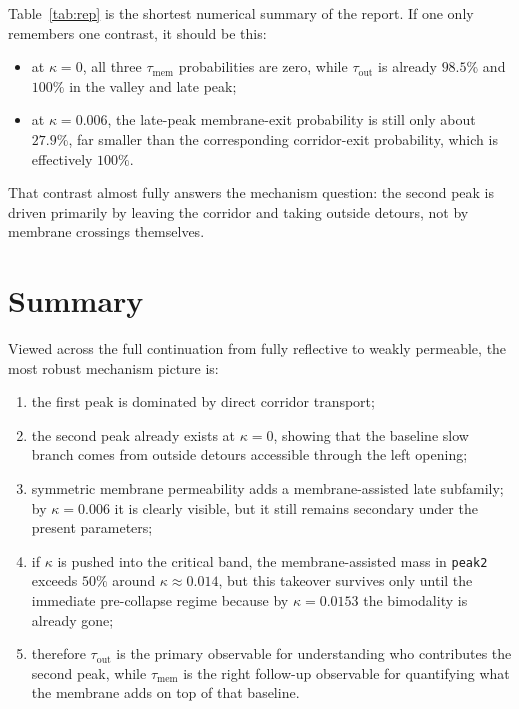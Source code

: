 \documentclass[11pt]{article}
\begin{document}
Table~\ref{tab:rep} is the shortest numerical summary of the report. If one only remembers one contrast, it should be this:
\begin{itemize}
  \item at \(\kappa=0\), all three \(\tau_{\mathrm{mem}}\) probabilities are zero, while \(\tau_{\mathrm{out}}\) is already \(98.5\%\) and \(100\%\) in the valley and late peak;
  \item at \(\kappa=0.006\), the late-peak membrane-exit probability is still only about \(27.9\%\), far smaller than the corresponding corridor-exit probability, which is effectively \(100\%\).
\end{itemize}
That contrast almost fully answers the mechanism question: the second peak is driven primarily by leaving the corridor and taking outside detours, not by membrane crossings themselves.

\section*{Summary}
Viewed across the full continuation from fully reflective to weakly permeable, the most robust mechanism picture is:
\begin{enumerate}
  \item the first peak is dominated by direct corridor transport;
  \item the second peak already exists at \(\kappa=0\), showing that the baseline slow branch comes from outside detours accessible through the left opening;
  \item symmetric membrane permeability adds a membrane-assisted late subfamily; by \(\kappa=0.006\) it is clearly visible, but it still remains secondary under the present parameters;
  \item if \(\kappa\) is pushed into the critical band, the membrane-assisted mass in \texttt{peak2} exceeds \(50\%\) around \(\kappa\approx 0.014\), but this takeover survives only until the immediate pre-collapse regime because by \(\kappa=0.0153\) the bimodality is already gone;
  \item therefore \(\tau_{\mathrm{out}}\) is the primary observable for understanding who contributes the second peak, while \(\tau_{\mathrm{mem}}\) is the right follow-up observable for quantifying what the membrane adds on top of that baseline.
\end{enumerate}
\end{document}
